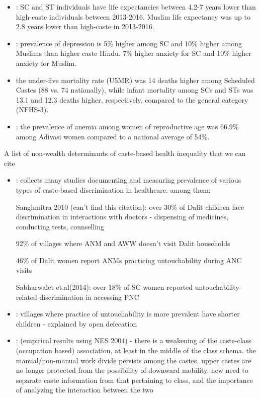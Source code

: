 \begin{itemize}

    \item \cite{gupta2022large}: SC and ST individuals have life expectancies between 4.2-7 years lower than high-caste individuals between 2013-2016. Muslim life expectancy was up to 2.8 years lower than high-caste in 2013-2016.

    \item \cite{gupta2020caste}: prevalence of depression is 5\% higher among SC and 10\% higher among Muslims than higher caste Hindu. 7\% higher anxiety for SC and 10\% higher anxiety for Muslim. 

    \item \cite{ramaiah2015health} the under-five mortality rate (U5MR) was 14 deaths higher among Scheduled Castes (88 vs. 74 nationally), while infant mortality among SCs and STs was 13.1 and 12.3 deaths higher, respectively, compared to the general category (NFHS-3). 
    
    \item \cite{let2024prevalence}: the prevalence of anemia among women of reproductive age was 66.9\% among Adivasi women compared to a national average of 54\%.

\end{itemize}



A list of non-wealth determinants of caste-based health inequality that we can cite
\begin{itemize}
    \item \cite{diwakar2015caste}: collects many studies documenting and measuring prevalence of various types of caste-based discrimination in healthcare. among them: 

    Sanghmitra 2010 (can't find this citation): over 30\% of Dalit children face discrimination in interactions with doctors - dispensing of medicines, conducting tests, counselling

    92\% of villages where ANM and AWW doesn't visit Dalit households

    46\% of Dalit women report ANMs practicing untouchability during ANC visits

    
    Sabharwalet et.al(2014): over 18\% of SC women reported untouchability-related discrimination in accessing PNC

    \item \cite{lopalo2019consequences}: villages where practice of untouchability is more prevalent have shorter children - explained by open defecation

    \item \cite{vaid2012caste}: (empirical results using NES 2004) - there is a weakening of
    the caste-class (occupation based) association, at least in the middle of the class schema. the manual/non-manual work divide persists among the castes. upper castes are no longer protected from the possibility of downward mobility. new need to separate caste information from that pertaining to class, and the importance of analyzing the interaction between the two
    
\end{itemize}


